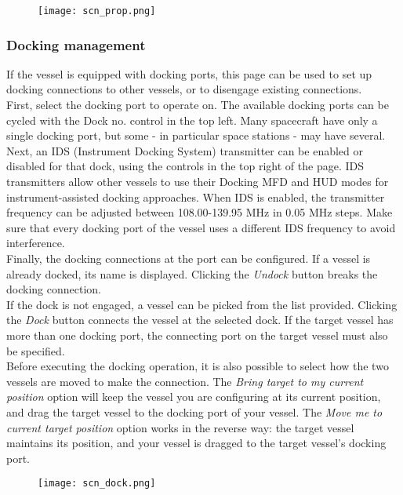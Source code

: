 \documentclass[Orbiter User Manual.tex]{subfiles}
\begin{document}
\begin{figure}[H]
	\centering
	\texttt{[image: scn\_prop.png]}
\end{figure}

\subsubsection{Docking management}
If the vessel is equipped with docking ports, this page can be used to set up docking connections to other vessels, or to disengage existing connections.\\
First, select the docking port to operate on. The available docking ports can be cycled with the Dock no. control in the top left. Many spacecraft have only a single docking port, but some - in particular space stations - may have several.\\
Next, an IDS (Instrument Docking System) transmitter can be enabled or disabled for that dock, using the controls in the top right of the page. IDS transmitters allow other vessels to use their Docking MFD and HUD modes for instrument-assisted docking approaches. When IDS is enabled, the transmitter frequency can be adjusted between 108.00-139.95 MHz in 0.05 MHz steps. Make sure that every docking port of the vessel uses a different IDS frequency to avoid interference.\\
Finally, the docking connections at the port can be configured. If a vessel is already docked, its name is displayed. Clicking the \textit{Undock} button breaks the docking connection.\\
If the dock is not engaged, a vessel can be picked from the list provided. Clicking the \textit{Dock} button connects the vessel at the selected dock. If the target vessel has more than one docking port, the connecting port on the target vessel must also be specified.\\
Before executing the docking operation, it is also possible to select how the two vessels are moved to make the connection. The \textit{Bring target to my current position} option will keep the vessel you are configuring at its current position, and drag the target vessel to the docking port of your vessel. The \textit{Move me to current target position} option works in the reverse way: the target vessel maintains its position, and your vessel is dragged to the target vessel's docking port.

\begin{figure}[H]
	\centering
	\texttt{[image: scn\_dock.png]}
\end{figure}
\end{document}
